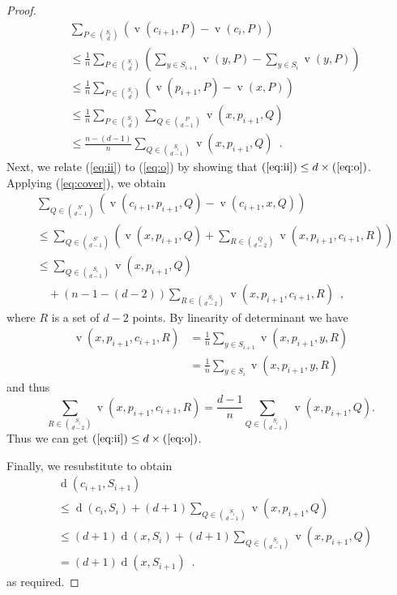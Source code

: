 \documentclass{cccg10}
\DeclareMathOperator{\od}{d}
\DeclareMathOperator{\vol}{v}
\begin{document}
\begin{proof}
\[
  \begin{aligned}
  & \!\!\! \sum_{P \in \binom{S_i}{d}} (\vol(c_{i+1}, P)- \vol(c_i,P)) \\
  & \le \frac{1}{n} \sum_{P \in \binom{S_i}{d}} \left( \sum_{y \in S_{i+1}} \vol(y,P)  -  \sum_{y \in S_{i}} \vol(y,P)\right)\\
  & \le \frac{1}{n} \sum_{P \in \binom{S_i}{d}}( \vol(p_{i+1},P) - \vol(x,P)) \\
  & \le \frac{1}{n} \sum_{P \in \binom{S_i}{d}} \sum_{Q \in \binom{P}{d-1}} \vol(x,p_{i+1}, Q)  \\
  & \le \frac{n-(d-1)}{n} \sum_{Q \in \binom{S_i}{d-1}}  \vol(x,p_{i+1}, Q)  \enspace .
  \end{aligned}
\]
Next, we relate (\ref{eq:ii}) to (\ref{eq:o}) by showing that $(\ref{eq:ii}) \le d\times (\ref{eq:o})$. Applying (\ref{eq:cover}), we obtain
\[
  \begin{aligned}
     & \!\!\! \sum_{Q\in \binom{S'}{d-1}}
           (\vol(c_{i+1},p_{i+1},Q)- \vol(c_{i+1},x,Q)) \\
     &\le  \sum_{Q\in \binom{S'}{d-1}} 
           \left(\vol(x,p_{i+1},Q) + \sum_{R \in \binom{Q}{d-2}} \vol(x,p_{i+1},c_{i+1},R)\right) \\
     &\le  \sum_{Q \in \binom{S_i}{d-1}}  \vol(x,p_{i+1}, Q) \\
     & \quad + (n-1 - (d-2)) \sum_{R \in \binom{S_i}{d-2}} \vol(x,p_{i+1},c_{i+1},R) \enspace ,
  \end{aligned}
\]
where $R$ is a set of $d-2$ points. By linearity of determinant we have
\[
  \begin{aligned}
  \vol(x,p_{i+1},c_{i+1},R) & = \frac{1}{n} \sum_{y \in S_{i+1}} \vol(x,p_{i+1},y,R) \\
  & = \frac{1}{n} \sum_{y \in S_{i}} \vol(x,p_{i+1},y,R)
  \end{aligned}
\]
and thus
\[
\sum_{R \in \binom{S_i}{d-2}} \vol(x,p_{i+1},c_{i+1},R) = \frac{d-1}{n}\sum_{Q \in \binom{S_i}{d-1}}  \vol(x,p_{i+1}, Q).
\]
Thus we can get $(\ref{eq:ii}) \le d\times (\ref{eq:o})$.


Finally, we resubstitute to obtain
\[
  \begin{aligned}
     & \!\!\! \od(c_{i+1},S_{i+1}) \\
     &\le \od(c_{i},S_{i}) + (d+1) \sum_{Q\in\binom{S_i}{d-1}} \vol(x,p_{i+1},Q)\\
     &\le (d+1) \od(x,S_{i}) + (d+1) \sum_{Q\in\binom{S_i}{d-1}} \vol(x,p_{i+1},Q) \\
     & = (d+1) \od(x,S_{i+1})  \enspace .
  \end{aligned}
\]
as required.
\end{proof}
\end{document}
